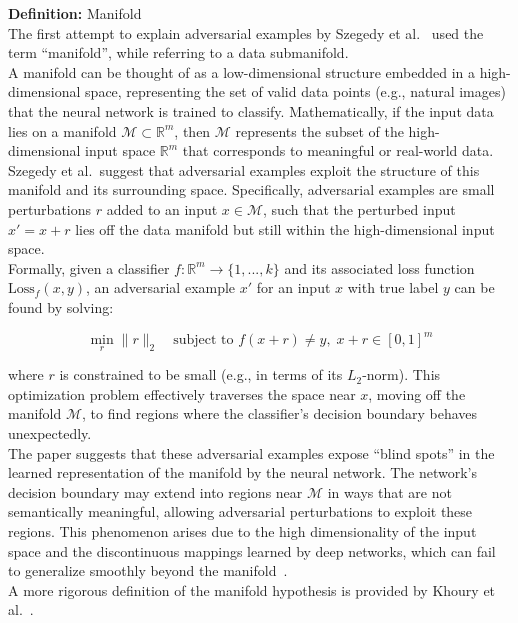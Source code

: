 \documentclass[a4paper, oneside]{discothesis}
\begin{document}
\begin{highlightbox}
	\textbf{Definition:} Manifold \\
	
	The first attempt to explain adversarial examples by Szegedy et al.\ \cite{szegedy2013intriguing} used the term ``manifold'', while referring to a data submanifold. \\
		
	A manifold can be thought of as a low-dimensional structure embedded in a high-dimensional space, representing the set of valid data points (e.g., natural images) that the neural network is trained to classify. Mathematically, if the input data lies on a manifold $\mathcal{M} \subset \mathbb{R}^m$, then $\mathcal{M}$ represents the subset of the high-dimensional input space $\mathbb{R}^m$ that corresponds to meaningful or real-world data. \\

	Szegedy et al.\ suggest that adversarial examples exploit the structure of this manifold and its surrounding space. Specifically, adversarial examples are small perturbations $r$ added to an input $x \in \mathcal{M}$, such that the perturbed input $x' = x + r$ lies off the data manifold but still within the high-dimensional input space. \\
	
	Formally, given a classifier $f: \mathbb{R}^m \to \{1, ..., k\}$ and its associated loss function $\text{Loss}_f(x, y)$, an adversarial example $x'$ for an input $x$ with true label $y$ can be found by solving:
	
	$$\min_{r} \|r\|_2 \quad \text{subject to } f(x + r) \neq y, \; x + r \in [0, 1]^m$$
	
	where $r$ is constrained to be small (e.g., in terms of its $L_2$-norm). This optimization problem effectively traverses the space near $x$, moving off the manifold $\mathcal{M}$, to find regions where the classifier's decision boundary behaves unexpectedly. \\
	
	The paper suggests that these adversarial examples expose ``blind spots'' in the learned representation of the manifold by the neural network. The network's decision boundary may extend into regions near $\mathcal{M}$ in ways that are not semantically meaningful, allowing adversarial perturbations to exploit these regions. This phenomenon arises due to the high dimensionality of the input space and the discontinuous mappings learned by deep networks, which can fail to generalize smoothly beyond the manifold~\cite{khoury2018geometry, Jha2018DetectingAE, Sha2020ADA, dube2018high, shamir2021dimpled}. \\
	
	A more rigorous definition of the manifold hypothesis is provided by Khoury et al.\ \cite{khoury2018geometry}.
\end{highlightbox}
\end{document}
